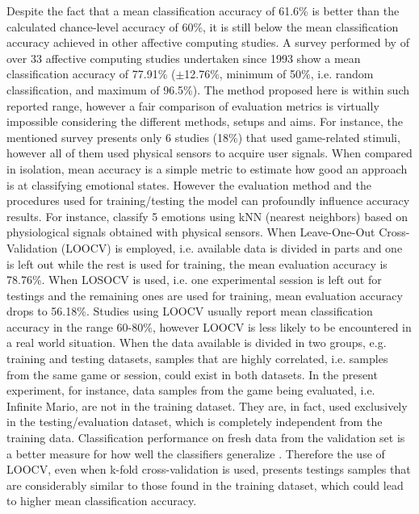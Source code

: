Despite the fact that a mean classification accuracy of 61.6\% is better than the calculated chance-level accuracy of 60\%, it is still below the mean classification accuracy achieved in other affective computing studies. A survey performed by \textcite{moghimi2017affective} of over 33 affective computing studies undertaken since 1993 show a mean classification accuracy of 77.91\% ($\pm$12.76\%, minimum of 50\%, i.e. random classification, and maximum of 96.5\%). The method proposed here is within such reported range, however a fair comparison of evaluation metrics is virtually impossible considering the different methods, setups and aims. For instance, the mentioned survey presents only 6 studies (18\%) that used game-related stimuli, however all of them used physical sensors to acquire user signals. When compared in isolation, mean accuracy is a simple metric to estimate how good an approach is at classifying emotional states. However the evaluation method and the procedures used for training/testing the model can profoundly influence accuracy results. For instance, \textcite{kukolja2014comparative} classify 5 emotions using kNN (nearest neighbors) based on physiological signals obtained with physical sensors. When Leave-One-Out Cross-Validation (LOOCV) is employed, i.e. available data is divided in parts and one is left out while the rest is used for training, the mean evaluation accuracy is 78.76\%. When LOSOCV is used, i.e. one experimental session is left out for testings and the remaining ones are used for training, mean evaluation accuracy drops to 56.18\%. Studies using LOOCV usually report mean classification accuracy in the range 60-80\%, however LOOCV is less likely to be encountered in a real world situation. When the data available is divided in two groups, e.g. training and testing datasets, samples that are highly correlated, i.e. samples from the same game or session, could exist in both datasets. In the present experiment, for instance, data samples from the game being evaluated, i.e. Infinite Mario, are not in the training dataset. They are, in fact, used exclusively in the testing/evaluation dataset, which is completely independent from the training data. Classification performance on fresh data from the validation set is a better measure for how well the classifiers generalize \parencite[Chapter 5]{james2013introduction}. Therefore the use of LOOCV, even when k-fold cross-validation is used, presents testings samples that are considerably similar to those found in the training dataset, which could lead to higher mean classification accuracy.

